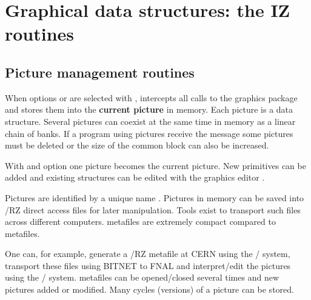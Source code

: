 
\chapter{Graphical data structures: the IZ routines}

\section{Picture management routines}

When options  or  are selected with , \HIGZ{}
intercepts all calls to the graphics package and stores them into the
{\bf current picture} in memory. Each picture is a \ZEBRA{} data structure.
Several pictures can coexist at the same time in memory as a \ZEBRA{} linear
chain of banks. If a program using pictures receive the message
 some pictures must be deleted or the size
of the  common block can also be increased.

With  and option  one picture becomes the current picture.
New primitives can be added and existing structures can be edited
with the graphics editor .

Pictures are identified by a unique name .
Pictures in memory can be saved into \ZEBRA/RZ direct access files
for later manipulation.
Tools exist to transport such files across different computers.
\HIGZ{} metafiles are extremely compact compared to \GKS{} metafiles.

One can, for example, generate a \HIGZ/RZ metafile at CERN using
the \HIGZ/\GKSGRAL{} system, transport these files using BITNET
to FNAL and interpret/edit the pictures using the \HIGZ/ system.
\HIGZ{} metafiles can be opened/closed several times and new pictures
added or modified. Many cycles (versions) of a picture can be stored.

